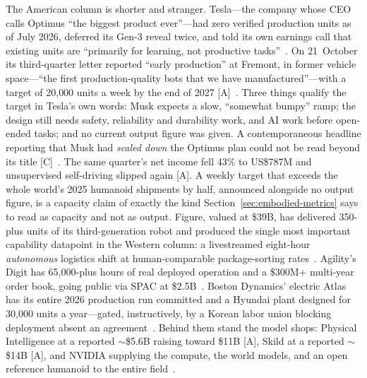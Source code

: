 The American column is shorter and stranger. Tesla---the company whose CEO calls Optimus ``the biggest product ever''---had zero verified production units as of July 2026, deferred its Gen-3 reveal twice, and told its own earnings call that existing units are ``primarily for learning, not productive tasks''~\cite{optimus-zero}. On 21~October its third-quarter letter reported ``early production'' at Fremont, in former vehicle space---``the first production-quality bots that we have manufactured''---with a target of 20{,}000 units a week by the end of 2027 [A]~\cite{hw-tesla-q3}. Three things qualify the target in Tesla's own words: Musk expects a slow, ``somewhat bumpy'' ramp; the design still needs safety, reliability and durability work, and AI work before open-ended tasks; and no current output figure was given. A contemporaneous headline reporting that Musk had \emph{scaled down} the Optimus plan could not be read beyond its title [C]~\cite{hw-tesla-q3}. The same quarter's net income fell 43\% to US\$787M and unsupervised self-driving slipped again [A]. A weekly target that exceeds the whole world's 2025 humanoid shipments by half, announced alongside no output figure, is a capacity claim of exactly the kind Section~\ref{sec:embodied-metrics} says to read as capacity and not as output. Figure, valued at \$39B, has delivered 350-plus units of its third-generation robot and produced the single most important capability datapoint in the Western column: a livestreamed eight-hour \emph{autonomous} logistics shift at human-comparable package-sorting rates~\cite{helix,figure-c}. Agility's Digit has 65{,}000-plus hours of real deployed operation and a \$300M+ multi-year order book, going public via SPAC at \$2.5B~\cite{agility-spac}. Boston Dynamics' electric Atlas has its entire 2026 production run committed and a Hyundai plant designed for 30{,}000 units a year---gated, instructively, by a Korean labor union blocking deployment absent an agreement~\cite{atlas}. Behind them stand the model shops: Physical Intelligence at a reported $\sim$\$5.6B raising toward \$11B [A], Skild at a reported $\sim$\$14B [A], and NVIDIA supplying the compute, the world models, and an open reference humanoid to the entire field~\cite{pi-models,jetson-thor}.

